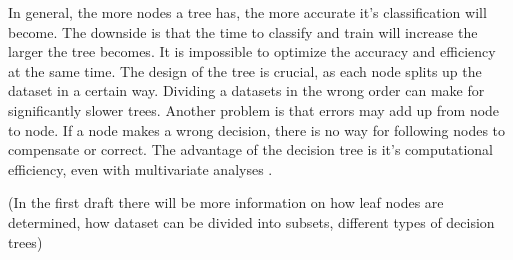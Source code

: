 In general, the more nodes a tree has, the more accurate it's classification will become. The downside is that the time to classify and train will increase the larger the tree becomes. It is impossible to optimize the accuracy and efficiency at the same time. The design of the tree is crucial, as each node splits up the dataset in a certain way. Dividing a datasets in the wrong order can make for significantly slower trees. Another problem is that errors may add up from node to node. If a node makes a wrong decision, there is no way for following nodes to compensate or correct. The advantage of the decision tree is it's computational efficiency, even with multivariate analyses \cite{safavian1991survey}.

(In the first draft there will be more information on how leaf nodes are determined, how dataset can be divided into subsets, different types of decision trees)